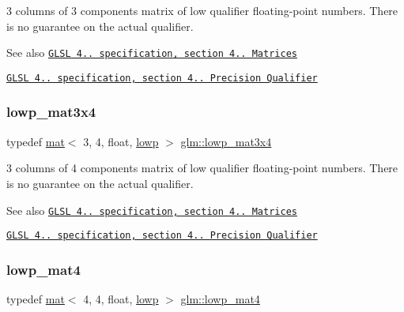 3 columns of 3 components matrix of low qualifier floating-\/point numbers. There is no guarantee on the actual qualifier.

\begin{DoxySeeAlso}{See also}
\href{http://www.opengl.org/registry/doc/GLSLangSpec.4.20.8.pdf}{\tt G\+L\+SL 4.. specification, section 4.. Matrices} 

\href{http://www.opengl.org/registry/doc/GLSLangSpec.4.20.8.pdf}{\tt G\+L\+SL 4.. specification, section 4.. Precision Qualifier} 
\end{DoxySeeAlso}
\mbox{\label{group__core__precision_ga9340ce338f4e973abeccf7309281ef31}} 
\subsubsection{\texorpdfstring{lowp\+\_\+mat3x4}{lowp\_mat3x4}}
{\footnotesize\ttfamily typedef \mbox{\hyperlink{structglm_1_1mat}{mat}}$<$ 3, 4, float, \mbox{\hyperlink{namespaceglm_a36ed105b07c7746804d7fdc7cc90ff25ae161af3fc695e696ce3bf69f7332bc2d}{lowp}} $>$ \mbox{\hyperlink{group__core__precision_ga9340ce338f4e973abeccf7309281ef31}{glm\+::lowp\+\_\+mat3x4}}}

3 columns of 4 components matrix of low qualifier floating-\/point numbers. There is no guarantee on the actual qualifier.

\begin{DoxySeeAlso}{See also}
\href{http://www.opengl.org/registry/doc/GLSLangSpec.4.20.8.pdf}{\tt G\+L\+SL 4.. specification, section 4.. Matrices} 

\href{http://www.opengl.org/registry/doc/GLSLangSpec.4.20.8.pdf}{\tt G\+L\+SL 4.. specification, section 4.. Precision Qualifier} 
\end{DoxySeeAlso}
\mbox{\label{group__core__precision_ga692c14e84ad690b182373bec9fdf1ab9}} 
\subsubsection{\texorpdfstring{lowp\+\_\+mat4}{lowp\_mat4}}
{\footnotesize\ttfamily typedef \mbox{\hyperlink{structglm_1_1mat}{mat}}$<$ 4, 4, float, \mbox{\hyperlink{namespaceglm_a36ed105b07c7746804d7fdc7cc90ff25ae161af3fc695e696ce3bf69f7332bc2d}{lowp}} $>$ \mbox{\hyperlink{group__core__precision_ga692c14e84ad690b182373bec9fdf1ab9}{glm\+::lowp\+\_\+mat4}}}

